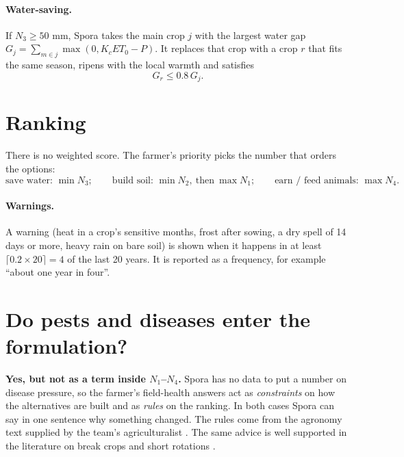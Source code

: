 \documentclass[11pt,a4paper]{article}
\begin{document}
\paragraph{Water-saving.} If $N_3\ge 50$ mm, Spora takes the main crop $j$ with the largest water gap
$G_j=\sum_{m\in j}\max(0,K_cET_0-P)$. It replaces that crop with a crop $r$ that fits the same season, ripens with
the local warmth and satisfies
\[
G_r\le 0.8\,G_j .
\]

\section{Ranking}
There is no weighted score. The farmer's priority picks the number that orders the options:
\[
\text{save water: } \min N_3;\qquad
\text{build soil: } \min N_2,\ \text{then}\ \max N_1;\qquad
\text{earn / feed animals: } \max N_4 .
\]

\paragraph{Warnings.} A warning (heat in a crop's sensitive months, frost after sowing, a dry spell of 14 days or more,
heavy rain on bare soil) is shown when it happens in at least $\lceil 0.2\times 20\rceil=4$ of the last 20 years. It is
reported as a frequency, for example ``about one year in four''.

\section{Do pests and diseases enter the formulation?}
\textbf{Yes, but not as a term inside $N_1$--$N_4$.} Spora has no data to put a number on disease pressure,
so the farmer's field-health answers act as \emph{constraints} on how the alternatives are built and as
\emph{rules} on the ranking. In both cases Spora can say in one sentence why something changed. The rules come
from the agronomy text supplied by the team's agriculturalist \cite{agrotext}.
The same advice is well supported in the literature on break crops and short rotations
\cite{kirkegaard2008,angus2015,bennett2012}.
\end{document}
